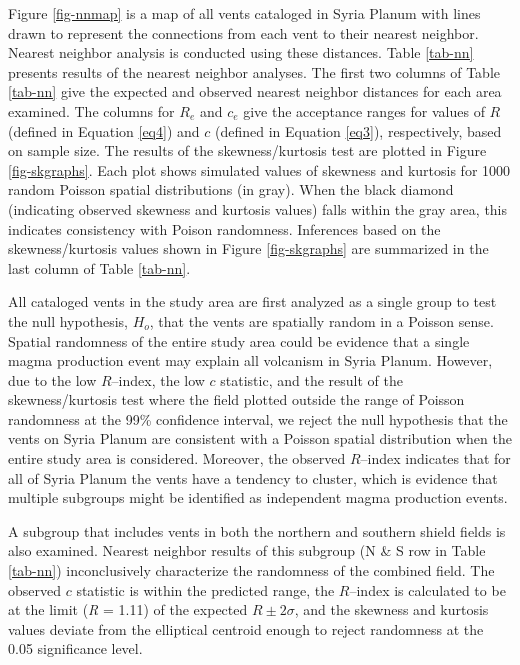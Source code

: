 Figure \ref{fig-nnmap} is a map of all vents cataloged in Syria Planum with lines drawn to represent the connections from each vent to their nearest neighbor. Nearest neighbor analysis is conducted using these distances. Table \ref{tab-nn} presents results of the nearest neighbor analyses. The first two columns of Table \ref{tab-nn} give the expected and observed nearest neighbor distances for each area examined. The columns for $R_e$ and $c_e$ give the acceptance ranges for values of $R$ (defined in Equation \ref{eq4}) and $c$ (defined in Equation \ref{eq3}), respectively, based on sample size. The results of the skewness/kurtosis test are plotted in Figure \ref{fig-skgraphs}. Each plot shows simulated values of skewness and kurtosis for 1000 random Poisson spatial distributions (in gray). When the black diamond (indicating observed skewness and kurtosis values) falls within the gray area, this indicates consistency with Poison randomness. Inferences based on the skewness/kurtosis values shown in Figure \ref{fig-skgraphs} are summarized in the last column of Table \ref{tab-nn}.

All cataloged vents in the study area are first analyzed as a single group to test the null hypothesis, $H_o$, that the vents are spatially random in a Poisson sense. Spatial randomness of the entire study area could be evidence that a single magma production event may explain all volcanism in Syria Planum. However, due to the low $R$--index, the low $c$ statistic, and the result of the skewness/kurtosis test where the field plotted outside the range of Poisson randomness at the 99\% confidence interval, we reject the null hypothesis that the vents on Syria Planum are consistent with a Poisson spatial distribution when the entire study area is considered. Moreover, the observed $R$--index indicates that for all of Syria Planum the vents have a tendency to cluster, which is evidence that multiple subgroups might be identified as independent magma production events.

A subgroup that includes vents in both the northern and southern shield fields is also examined. Nearest neighbor results of this subgroup (N \& S row in Table \ref{tab-nn}) inconclusively characterize the randomness of the combined field. The observed $c$ statistic is within the predicted range, the $R$--index is calculated to be at the limit (\textit{R} = 1.11) of the expected $R \pm 2\sigma$, and the skewness and kurtosis values deviate from the elliptical centroid enough to reject randomness at the 0.05 significance level.

